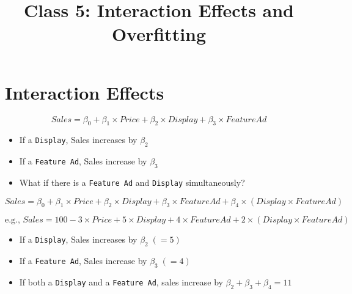 \documentclass[10pt,article]{article}
\date{\vspace{-6ex}}
\title{Class 5: Interaction Effects and Overfitting}
\begin{document}
\maketitle
{} 
\thispagestyle{fancy}

\setcounter{tocdepth}{1}
\tableofcontents
\vspace{6ex}

\section{Interaction Effects}
\label{sec:orge6fc72a}
\[  Sales = \beta_0 + \beta_1 \times Price + \beta_2 \times Display + \beta_3
      \times Feature Ad \]
\begin{itemize}
\item If a \texttt{Display}, Sales increases by \(\beta_2\)
\item If a \texttt{Feature Ad}, Sales increase by \(\beta_3\)
\item What if there is a \texttt{Feature Ad} and \texttt{Display} simultaneously?
\end{itemize}

\iffalse
\begin{align*}
 Sales = & \beta_0 + \beta_1 \times Price + \beta_2 \times Display + \beta_3 \times Feature Ad \\
         & + \beta_4 \times (Display \times Feature Ad)
\end{align*}



\begin{align*}
 Sales = & 100 - 3 \times Price + 5 \times Display + 4 \times Feature Ad \\
         & + 2 \times (Display \times Feature Ad)
\end{align*}
\fi



\[ Sales = \beta_0 + \beta_1 \times Price + \beta_2 \times Display + \beta_3
\times Feature Ad + \beta_4 \times (Display \times Feature Ad) \]

\[ \text{e.g., } Sales = 100 - 3 \times Price + 5 \times Display + 4 \times Feature Ad + 2
\times (Display \times Feature Ad) \]

\begin{itemize}
\item If a \texttt{Display}, Sales increases by \(\beta_2  \; (=5)\)
\item If a \texttt{Feature Ad}, Sales increase by \(\beta_3  \; (=4)\)
\item If both a \texttt{Display} and a \texttt{Feature Ad}, sales increase by \(\beta_2 +
  \beta_3 + \beta_4 = 11\)
\end{itemize}
\end{document}
